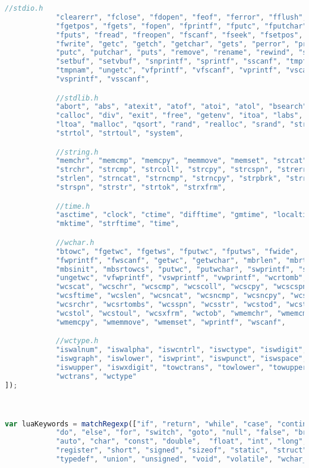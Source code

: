 \begin{lstlisting}[language=Javascript]
            //stdio.h
            "clearerr", "fclose", "fdopen", "feof", "ferror", "fflush", "fgetc",
            "fgetpos", "fgets", "fopen", "fprintf", "fputc", "fputchar",
            "fputs", "fread", "freopen", "fscanf", "fseek", "fsetpos", "ftell",
            "fwrite", "getc", "getch", "getchar", "gets", "perror", "printf",
            "putc", "putchar", "puts", "remove", "rename", "rewind", "scanf",
            "setbuf", "setvbuf", "snprintf", "sprintf", "sscanf", "tmpfile",
            "tmpnam", "ungetc", "vfprintf", "vfscanf", "vprintf", "vscanf",
            "vsprintf", "vsscanf",

            //stdlib.h
            "abort", "abs", "atexit", "atof", "atoi", "atol", "bsearch",
            "calloc", "div", "exit", "free", "getenv", "itoa", "labs", "ldiv",
            "ltoa", "malloc", "qsort", "rand", "realloc", "srand", "strtod",
            "strtol", "strtoul", "system",

            //string.h
            "memchr", "memcmp", "memcpy", "memmove", "memset", "strcat",
            "strchr", "strcmp", "strcoll", "strcpy", "strcspn", "strerror",
            "strlen", "strncat", "strncmp", "strncpy", "strpbrk", "strrchr",
            "strspn", "strstr", "strtok", "strxfrm",

            //time.h
            "asctime", "clock", "ctime", "difftime", "gmtime", "localtime",
            "mktime", "strftime", "time",

            //wchar.h
            "btowc", "fgetwc", "fgetws", "fputwc", "fputws", "fwide",
            "fwprintf", "fwscanf", "getwc", "getwchar", "mbrlen", "mbrtowc",
            "mbsinit", "mbsrtowcs", "putwc", "putwchar", "swprintf", "swscanf",
            "ungetwc", "vfwprintf", "vswprintf", "vwprintf", "wcrtomb",
            "wcscat", "wcschr", "wcscmp", "wcscoll", "wcscpy", "wcscspn",
            "wcsftime", "wcslen", "wcsncat", "wcsncmp", "wcsncpy", "wcspbrk",
            "wcsrchr", "wcsrtombs", "wcsspn", "wcsstr", "wcstod", "wcstok",
            "wcstol", "wcstoul", "wcsxfrm", "wctob", "wmemchr", "wmemcmp",
            "wmemcpy", "wmemmove", "wmemset", "wprintf", "wscanf",

            //wctype.h
            "iswalnum", "iswalpha", "iswcntrl", "iswctype", "iswdigit",
            "iswgraph", "iswlower", "iswprint", "iswpunct", "iswspace",
            "iswupper", "iswxdigit", "towctrans", "towlower", "towupper",
            "wctrans", "wctype"
]);



var luaKeywords = matchRegexp(["if", "return", "while", "case", "continue", "default",
            "do", "else", "for", "switch", "goto", "null", "false", "break", "true", "function", "enum", "extern", "inline",
            "auto", "char", "const", "double",  "float", "int", "long",
            "register", "short", "signed", "sizeof", "static", "struct",
            "typedef", "union", "unsigned", "void", "volatile", "wchar_t",


\end{lstlisting}
